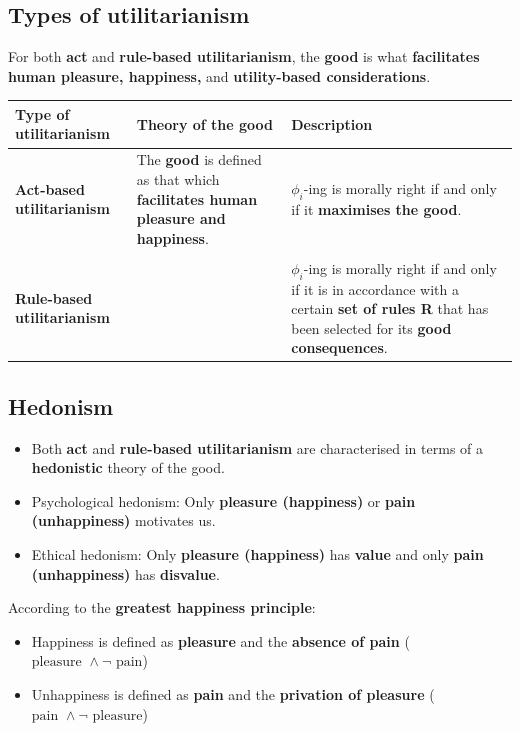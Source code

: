 \documentclass[11pt]{article}
\begin{document}
\subsection{Types of utilitarianism}
\label{sec:org5a8d591}
For both \textbf{act} and \textbf{rule-based utilitarianism}, the \textbf{good} is what \textbf{facilitates human pleasure, happiness,} and \textbf{utility-based considerations}.
\begin{center}
\begin{tabularx}{\textwidth}{|X|X|X|}
\hline
Type of utilitarianism & Theory of the good & Description\\
\hline
\textbf{Act-based utilitarianism} & The \textbf{good} is defined as that which \textbf{facilitates human pleasure and happiness}. & \(\phi_i\)-ing is morally right if and only if it \textbf{maximises the good}.\\
 &  & \\
\textbf{Rule-based utilitarianism} &  & \(\phi_i\)-ing is morally right if and only if it is in accordance with a certain \textbf{set of rules R} that has been selected for its \textbf{good consequences}.\\
\hline
\end{tabularx}
\end{center}
\subsection{Hedonism}
\label{sec:orgfef5928}
\begin{itemize}
\item Both \textbf{act} and \textbf{rule-based utilitarianism} are characterised in terms of a \textbf{hedonistic} theory of the good.
\item Psychological hedonism: Only \textbf{pleasure (happiness)} or \textbf{pain (unhappiness)} motivates us.
\item Ethical hedonism: Only \textbf{pleasure (happiness)} has \textbf{value} and only \textbf{pain (unhappiness)} has \textbf{disvalue}.
\end{itemize}

According to the \textbf{greatest happiness principle}:
\begin{itemize}
\item Happiness is defined as \textbf{pleasure} and the \textbf{absence of pain} (\(\text{pleasure } \wedge \neg \text{ pain}\))
\item Unhappiness is defined as \textbf{pain} and the \textbf{privation of pleasure} (\(\text{pain } \wedge \neg \text{ pleasure}\))
\end{itemize}
\end{document}
